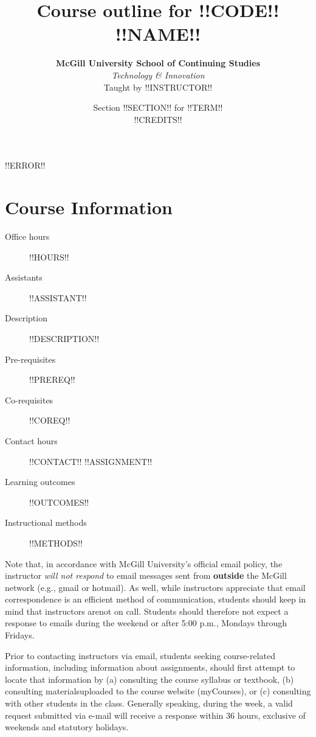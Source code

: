 \documentclass{article}
\title{Course outline for !!CODE!! \\ {\sc !!NAME!!}}
\date{Section !!SECTION!! for !!TERM!! \\ !!CREDITS!!}
\author{{\bf McGill University School of Continuing Studies} \\
  {\em Technology \& Innovation} \\
  Taught by !!INSTRUCTOR!! }
\begin{document}
\maketitle

\thispagestyle{fancy}

!!ERROR!!

\newpage

\tableofcontents
{}

\newpage

\section{Course Information}

\begin{description}
\item[Office hours]{ !!HOURS!!}
\item[Assistants]{ !!ASSISTANT!! }
\item[Description]{ !!DESCRIPTION!! }
\item[Pre-requisites]{!!PREREQ!!}
\item[Co-requisites]{!!COREQ!!}
\item[Contact hours]{!!CONTACT!!}
!!ASSIGNMENT!!
\item[Learning outcomes]{ !!OUTCOMES!! }
\item[Instructional methods]{ !!METHODS!! }

\end{description}

Note that, in accordance with McGill University’s official email
policy, the instructor {\em will not respond} to email messages sent
from {\bf outside} the McGill network (e.g., gmail or hotmail). As
well, while instructors appreciate that email correspondence is an
efficient method of communication, students should keep in mind that
instructors arenot on call. Students should therefore not expect a
response to emails during the weekend or after 5:00 p.m., Mondays
through Fridays.

Prior to contacting instructors via email, students seeking
course-related information, including information about assignments,
should first attempt to locate that information by (a) consulting the
course syllabus or textbook, (b) consulting materialsuploaded to the
course website (myCourses), or (c) consulting with other students in
the class. Generally speaking, during the week, a valid request
submitted via e-mail will receive a response within 36 hours,
exclusive of weekends and statutory holidays.
\end{document}
